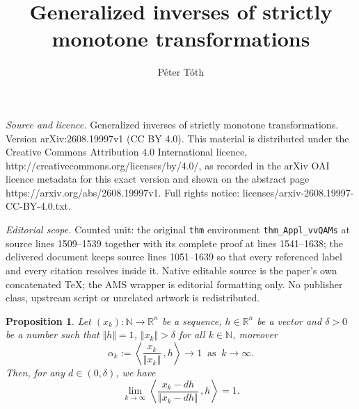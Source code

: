 \documentclass[10pt,a4paper]{amsart}
\newtheorem{prop}{Proposition}%
\newcommand{\NN}{\mathbb{N}}
\newcommand{\Rn}{\mathbb{R}^n}
\newcommand{\nma}{\Vert}
\newcommand{\map}{\longrightarrow}
\newcommand{\bsz}[2]{\left \langle #1 \,, #2 \right \rangle}
\begin{document}
\title[Generalized inverses of strictly monotone transformations]{Generalized inverses of strictly monotone transformations}
\author{Péter Tóth}
\date{}
\maketitle
\noindent\emph{Source and licence.} Generalized inverses of strictly monotone transformations. Version arXiv:2608.19997v1 (CC BY 4.0). This material is distributed under the Creative Commons Attribution 4.0 International licence, http://creativecommons.org/licenses/by/4.0/, as recorded in the arXiv OAI licence metadata for this exact version and shown on the abstract page https://arxiv.org/abs/2608.19997v1. Full rights notice: licenses/arxiv-2608.19997-CC-BY-4.0.txt.\par\smallskip
\noindent\textit{Editorial scope.} Counted unit: the original \texttt{thm} environment \texttt{thm\_Appl\_vvQAMs} at source lines 1509--1539 together with its complete proof at lines 1541--1638; the delivered document keeps source lines 1051--1639 so that every referenced label and every citation resolves inside it. Native editable source is the paper's own concatenated TeX; the AMS wrapper is editorial formatting only. No publisher class, upstream script or unrelated artwork is redistributed.
\begin{prop}\label{prop-AngleLimit}
Let $ (x_k) : \NN \map \Rn $ be a sequence, 
$ h \in \Rn $ be a vector and $ \delta > 0 $ be a number 
such that $ \nma h \nma = 1 $, 
$ \nma x_k \nma > \delta $ for all $ k \in \NN $, moreover 
\[
\alpha_k := 
\bsz	{\frac{x_k}{\nma x_k \nma}}{h} \to 1 
\ \mbox{ as } \ k \to \infty. 
\]
Then, for any $ d \in \left( 0, \delta \right) $, 
we have 
\[
\lim_{k \to \infty} 
\bsz{\frac{x_k-dh}{\nma x_k - dh \nma}}{h} 
= 1.
\] 
\end{prop}
\end{document}
